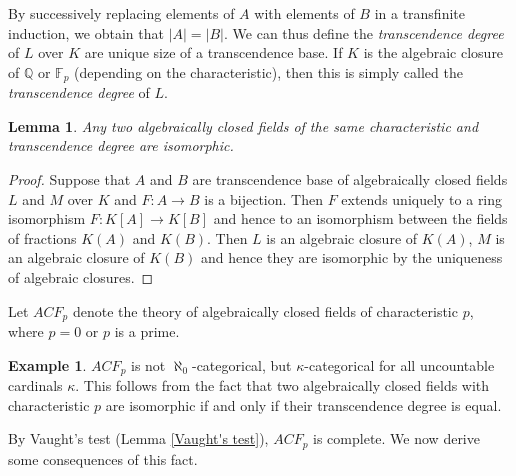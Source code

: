 \documentclass[10pt]{amsart}
\newcommand{\FF}{\mathbb{F}}
\newcommand{\QQ}{\mathbb{Q}}
\newtheorem{lemma}[theorem]{Lemma}
\theoremstyle{definition}
\newtheorem{example}[theorem]{Example}
\theoremstyle{remark}
\begin{document}
By successively replacing elements of $A$ with elements of $B$ in a transfinite induction, we obtain that $|A|=|B|$. We can thus define the \emph{transcendence degree} of $L$ over $K$ are unique size of a transcendence base. If $K$ is the algebraic closure of $\QQ$ or $\FF_p$ (depending on the characteristic), then this is simply called the \emph{transcendence degree} of $L$. 

\begin{lemma} 
Any two algebraically closed fields of the same characteristic and transcendence degree are isomorphic. 
\end{lemma} 
\begin{proof} 
Suppose that 
$A$ and $B$ are transcendence base of algebraically closed fields $L$ and $M$ over $K$ and $F\colon A\rightarrow B$ is a bijection. Then $F$ extends uniquely to a ring isomorphism $F\colon K[A]\rightarrow K[B]$ and hence to an isomorphism between the fields of fractions $K(A)$ and $K(B)$. Then $L$ is an algebraic closure of $K(A)$, $M$ is an algebraic closure of $K(B)$ and hence they are isomorphic by the uniqueness of algebraic closures. 
\end{proof} 

Let $ACF_p$ denote the theory of algebraically closed fields of characteristic $p$, where $p=0$ or $p$ is a prime. 

\begin{example} 
$ACF_p$ is not $\aleph_0$-categorical, but $\kappa$-categorical for all uncountable cardinals $\kappa$. This follows from the fact that two algebraically closed fields with characteristic $p$ are isomorphic if and only if their transcendence degree is equal. 
\end{example} 

By Vaught's test (Lemma \ref{Vaught's test}), $ACF_p$ is complete. We now derive some consequences of this fact. 
\end{document}
